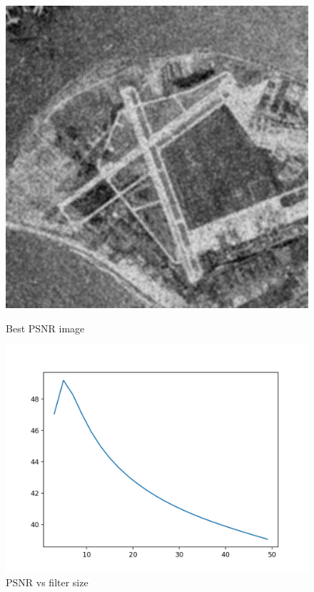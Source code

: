 \documentclass{article}
\begin{document}
    \begin{figure}[!htb]
      \includegraphics[scale=0.3]{./basic_denoising/sandiego/average_best_sp.png}
      \caption{Best PSNR image}
    \endminipage \hfill
      \includegraphics[scale=.45]{./basic_denoising/sandiego/average_psnr_sp.png}
      \caption{PSNR vs filter size}
    \endminipage
    \end{figure}
    
\end{document}
